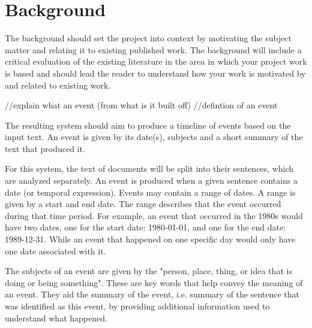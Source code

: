 \chapter{Background}
\par The background should set the project into context by motivating the subject matter and relating it to existing published work. The background will include a critical evaluation of the existing literature in the area in which your project work is based and should lead the reader to understand how your work is motivated by and related to existing work.

//explain what an event (from what is it built off) //defintion of an event
\par The resulting system should aim to produce a timeline of events based on the input text. An event is given by its date(s), subjects and a short summary of the text that produced it. 
\par For this system, the text of documents will be split into their sentences, which are analyzed separately. An event is produced when a given sentence contains a date (or temporal expression). Events may contain a range of dates. A range is given by a start and end date. The range describes that the event occurred during that time period. For example, an event that occurred in the 1980s would have two dates, one for the start date: 1980-01-01, and one for the end date: 1989-12-31. While an event that happened on one specific day would only have one date associated with it. 
\par The subjects of an event are given by the "person, place, thing, or idea that is doing or being something"\cite{grammar}. These are key words that help convey the meaning of an event. They aid the summary of the event, i.e. summary of the sentence that was identified as this event, by providing additional information used to understand what happened.

